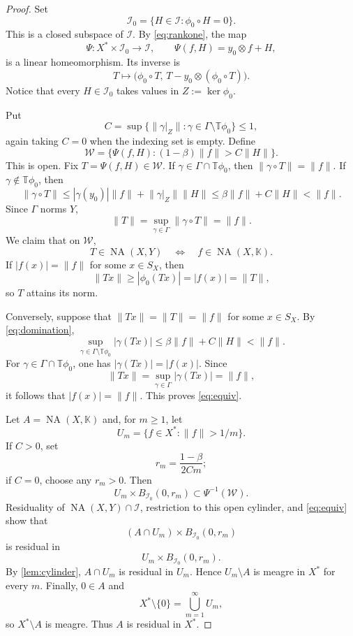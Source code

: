 \documentclass[11pt]{article}
\theoremstyle{definition}
\theoremstyle{remark}
\newcommand{\K}{\mathbb K}
\newcommand{\T}{\mathbb T}
\newcommand{\NA}{\operatorname{NA}}
\newcommand{\norm}[1]{\lVert #1\rVert}
\newcommand{\Sphere}{S}
\begin{document}
\begin{proof}
Set
\[
 \mathcal I_0=\{H\in\mathcal I:\phi_0\circ H=0\}.
\]
This is a closed subspace of $\mathcal I$.  By \eqref{eq:rankone}, the map
\[
 \Psi:X^*\times\mathcal I_0\longrightarrow\mathcal I,
 \qquad
 \Psi(f,H)=y_0\otimes f+H,
 \tag{3.3}\label{eq:Psi}
\]
is a linear homeomorphism.  Its inverse is
\[
 T\longmapsto
 \bigl(\phi_0\circ T,\,T-y_0\otimes(\phi_0\circ T)\bigr).
\]
Notice that every $H\in\mathcal I_0$ takes values in $Z:=\ker\phi_0$.

Put
\[
 C=\sup\bigl\{\norm{\gamma|_Z}:
       \gamma\in\Gamma\setminus\T\phi_0\bigr\}\le 1,
\]
again taking $C=0$ when the indexing set is empty.  Define
\[
 \mathcal W=\bigl\{\Psi(f,H):(1-\beta)\norm f>C\norm H\bigr\}.
 \tag{3.4}\label{eq:W}
\]
This is open.  Fix $T=\Psi(f,H)\in\mathcal W$.  If
$\gamma\in\Gamma\cap\T\phi_0$, then $\norm{\gamma\circ T}=\norm f$.  If
$\gamma\notin\T\phi_0$, then
\[
 \norm{\gamma\circ T}
 \le |\gamma(y_0)|\norm f+\norm{\gamma|_Z}\norm H
 \le \beta\norm f+C\norm H
 <\norm f.
 \tag{3.5}\label{eq:domination}
\]
Since $\Gamma$ norms $Y$,
\[
 \norm T
 =\sup_{\gamma\in\Gamma}\norm{\gamma\circ T}
 =\norm f.
 \tag{3.6}\label{eq:normequal}
\]
We claim that on $\mathcal W$,
\[
 T\in\NA(X,Y)
 \quad\Longleftrightarrow\quad
 f\in\NA(X,\K).
 \tag{3.7}\label{eq:equiv}
\]
If $|f(x)|=\norm f$ for some $x\in\Sphere_X$, then
\[
 \norm{Tx}\ge |\phi_0(Tx)|=|f(x)|=\norm T,
\]
so $T$ attains its norm.

Conversely, suppose that $\norm{Tx}=\norm T=\norm f$ for some
$x\in\Sphere_X$.  By \eqref{eq:domination},
\[
 \sup_{\gamma\in\Gamma\setminus\T\phi_0}|\gamma(Tx)|
 \le \beta\norm f+C\norm H<\norm f.
\]
For $\gamma\in\Gamma\cap\T\phi_0$, one has
$|\gamma(Tx)|=|f(x)|$.  Since
\[
 \norm{Tx}=\sup_{\gamma\in\Gamma}|\gamma(Tx)|=\norm f,
\]
it follows that $|f(x)|=\norm f$.  This proves \eqref{eq:equiv}.

Let $A=\NA(X,\K)$ and, for $m\ge1$, let
\[
 U_m=\{f\in X^*:\norm f>1/m\}.
\]
If $C>0$, set
\[
 r_m=\frac{1-\beta}{2Cm};
\]
if $C=0$, choose any $r_m>0$.  Then
\[
 U_m\times B_{\mathcal I_0}(0,r_m)
 \subset \Psi^{-1}(\mathcal W).
\]
Residuality of $\NA(X,Y)\cap\mathcal I$, restriction to this open cylinder, and \eqref{eq:equiv} show that
\[
 (A\cap U_m)\times B_{\mathcal I_0}(0,r_m)
\]
is residual in
\[
 U_m\times B_{\mathcal I_0}(0,r_m).
\]
By \cref{lem:cylinder}, $A\cap U_m$ is residual in $U_m$.  Hence
$U_m\setminus A$ is meagre in $X^*$ for every $m$.  Finally,
$0\in A$ and
\[
 X^*\setminus\{0\}=\bigcup_{m=1}^{\infty}U_m,
\]
so $X^*\setminus A$ is meagre.  Thus $A$ is residual in $X^*$.
\end{proof}
\end{document}
